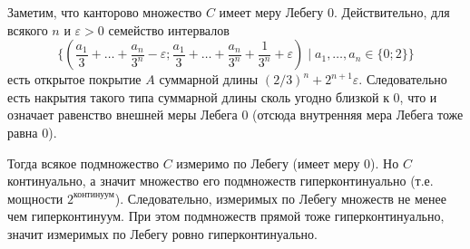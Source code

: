 \documentclass[12pt,a4paper]{article}
\begin{document}
    \begin{enumproblem}
        Заметим, что канторово множество $C$ имеет меру Лебегу $0$. Действительно, для всякого $n$ и $\varepsilon > 0$ семейство интервалов
        \[\{(\frac{a_1}{3} + \dots + \frac{a_n}{3^n} - \varepsilon; \frac{a_1}{3} + \dots + \frac{a_n}{3^n} + \frac{1}{3^n} + \varepsilon) \mid a_1, \dots, a_n \in \{0; 2\}\}\]
        есть открытое покрытие $A$ суммарной длины $(2/3)^n + 2^{n+1}\varepsilon$. Следовательно есть накрытия такого типа суммарной длины сколь угодно близкой к $0$, что и означает равенство внешней меры Лебега $0$ (отсюда внутренняя мера Лебега тоже равна $0$).

        Тогда всякое подмножество $C$ измеримо по Лебегу (имеет меру $0$). Но $C$ континуально, а значит множество его подмножеств гиперконтинуально (т.е. мощности $2^\text{континуум}$). Следовательно, измеримых по Лебегу множеств не менее чем гиперконтинуум. При этом подмножеств прямой тоже гиперконтинуально, значит измеримых по Лебегу ровно гиперконтинуально.
    \end{enumproblem}
\end{document}
